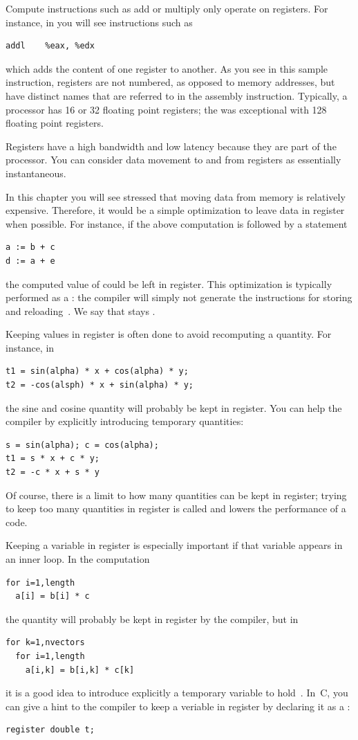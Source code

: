 Compute instructions such as add or multiply only operate on
registers. For instance, in 
you will see instructions such as
\begin{verbatim}
addl	%eax, %edx
\end{verbatim}
which adds the content of one register to
another. As you see in this sample instruction, registers are not
numbered, as opposed to memory addresses,
but have distinct names that are referred to in
the assembly instruction. Typically, a processor has 16 or 32
floating point registers; the  was
exceptional with 128 floating point registers.

Registers have a high bandwidth and low latency because they
are part of the processor. You can consider data movement to and from
registers as essentially instantaneous.

In this chapter you will see stressed that moving data from memory is
relatively expensive. Therefore, it would be a simple optimization to
leave data in register when possible. For instance, if the above
computation is followed by a statement
\begin{verbatim}
a := b + c
d := a + e
\end{verbatim}
the computed value of  could be left in register. This
optimization is typically performed as a
: the compiler will simply not
generate the instructions for storing and reloading~. We say that
 stays .

Keeping values in register is often done to avoid recomputing a
quantity. For instance, in 
\begin{verbatim}
t1 = sin(alpha) * x + cos(alpha) * y;
t2 = -cos(alsph) * x + sin(alpha) * y;
\end{verbatim}
the sine and cosine quantity will probably be kept in register. You
can help the compiler by explicitly introducing temporary quantities:
\begin{verbatim}
s = sin(alpha); c = cos(alpha);
t1 = s * x + c * y;
t2 = -c * x + s * y
\end{verbatim}
Of
course, there is a limit to how many quantities can be kept in
register; trying to keep too many quantities in register is called
 and lowers the performance of a code.

Keeping a variable in register is especially important if that
variable appears in an inner loop. In the computation
\begin{verbatim}
for i=1,length
  a[i] = b[i] * c
\end{verbatim}
the quantity  will probably be kept in register by the compiler,
but in 
\begin{verbatim}
for k=1,nvectors
  for i=1,length
    a[i,k] = b[i,k] * c[k]
\end{verbatim}
it is a good idea to introduce explicitly a temporary variable to
hold~. In~C, you can give a hint to the compiler
to keep a veriable in register by declaring it as a :
\begin{verbatim}
register double t;
\end{verbatim}

